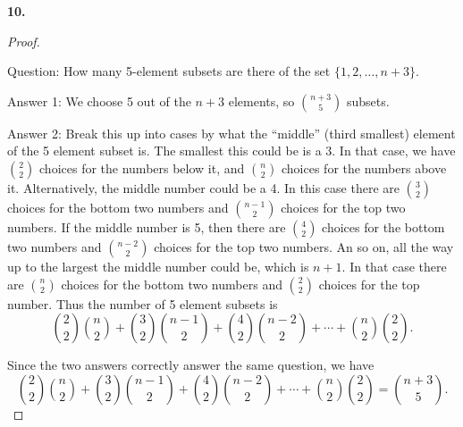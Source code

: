 \documentclass[10pt,]{book}
\theoremstyle{plain}
\theoremstyle{definition}
\theoremstyle{definition}
\theoremstyle{definition}
\numberwithin{equation}{section}
\begin{document}
\noindent\textbf{10.}\quad{}\begin{proof}\hypertarget{proof-12}{}

            Question: How many 5-element subsets are there of the set \(\{1,2,\ldots, n+3\}\).
\par

            Answer 1: We choose 5 out of the \(n+3\) elements, so \({n+3 \choose 5}\) subsets.
\par

            Answer 2: Break this up into cases by what the ``middle'' (third smallest) element of the 5 element subset is. The smallest this could be is a 3. In that case, we have \({2 \choose 2}\) choices for the numbers below it, and \({n \choose 2}\) choices for the numbers above it. Alternatively, the middle number could be a 4. In this case there are \({3 \choose 2}\) choices for the bottom two numbers and \({n-1 \choose 2}\) choices for the top two numbers. If the middle number is 5, then there are \({4 \choose 2}\) choices for the bottom two numbers and \({n-2 \choose 2}\) choices for the top two numbers. An so on, all the way up to the largest the middle number could be, which is \(n+1\). In that case there are \({n \choose 2}\) choices for the bottom two numbers and \({2 \choose 2}\) choices for the top number. Thus the number of 5 element subsets is
            \begin{equation*}
              {2 \choose 2}{n \choose 2} + {3 \choose 2}{n-1 \choose 2} + {4\choose 2}{n-2 \choose 2} + \cdots + {n\choose 2}{2\choose 2}.
            \end{equation*}
\par

            Since the two answers correctly answer the same question, we have
            \begin{equation*}
              {2 \choose 2}{n \choose 2} + {3 \choose 2}{n-1 \choose 2} + {4\choose 2}{n-2 \choose 2} + \cdots + {n\choose 2}{2\choose 2} = {n+3 \choose 5}.
            \end{equation*}
\end{proof}
\par\smallskip
\end{document}

